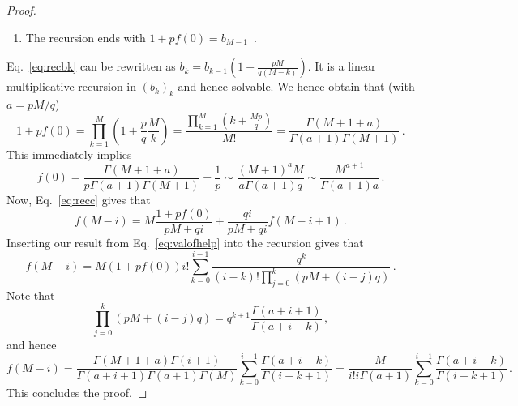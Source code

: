\documentclass[10pt,a4paper]{amsart}
\newcommand{\rk}[1]{\left(#1\right)}
\begin{document}
\begin{proof}
\begin{enumerate}
\begin{equation}
    \end{equation}
    \item The recursion ends with $1+pf(0)=b_{M-1}$\, .
\end{enumerate}
Eq.~\eqref{eq:recbk} can be rewritten as $b_{k}=b_{k-1}\rk{1+\tfrac{pM}{q(M-k)}}$. It is a linear multiplicative recursion in $(b_k)_k$ and hence solvable. We hence obtain that (with $a=pM/q$)
\begin{equation}\label{eq:valofhelp}
    1+pf(0)=\prod_{k=1}^M\rk{1+\frac{p}{q}\frac{M}{k}}=\frac{\prod_{k=1}^M\rk{k+\tfrac{Mp}{q}}}{M!}=\frac{\Gamma\rk{M+1+a}}{\Gamma(a+1)\Gamma(M+1)}\, .
\end{equation}
This immediately implies
\begin{equation}\label{eq:f0zerasympt}
    f(0)=\frac{\Gamma\rk{M+1+a}}{p\Gamma(a+1)\Gamma(M+1)}-\frac{1}{p}\sim \frac{(M+1)^aM}{a\Gamma(a+1)q}\sim \frac{M^{a+1}}{\Gamma(a+1)a}\, .
\end{equation}
Now, Eq.~\eqref{eq:recc} gives that
\begin{equation}
    f(M-i)=M\frac{1+pf(0)}{pM+qi}+\frac{qi}{pM+qi}f(M-i+1)\, .
\end{equation}
Inserting our result from Eq.~\eqref{eq:valofhelp} into the recursion gives that
\begin{equation}
    f(M-i)=M(1+pf(0))i!\sum_{k=0}^{i-1}\frac{q^{k}}{(i-k)!\prod_{j=0}^{k}\rk{pM+(i-j)q}}\, .
\end{equation}
Note that
\begin{equation}
    \prod_{j=0}^{k}\rk{pM+(i-j)q}=q^{k+1}\frac{\Gamma(a+i+1)}{\Gamma(a+i-k)}\, ,
\end{equation}
and hence
\begin{equation}
    f(M-i)=\frac{\Gamma(M+1+a)\Gamma(i+1)}{\Gamma(a+i+1)\Gamma(a+1)\Gamma(M)}\sum_{k=0}^{i-1}\frac{\Gamma(a+i-k)}{\Gamma(i-k+1)} =\frac{M}{i!i\Gamma(a+1)}\sum_{k=0}^{i-1}\frac{\Gamma(a+i-k)}{\Gamma(i-k+1)}\, .
\end{equation}
This concludes the proof.
\end{proof}
\end{document}

